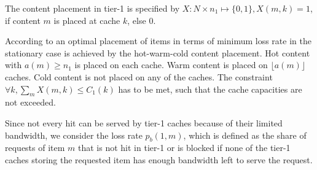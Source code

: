 The content placement in tier-1 is specified by $X: N \times n_1\mapsto \{0,1\}, X(m,k) = 1$, if content $m$ is placed at cache $k$, else $0$.

According to \cite{valancius2009greening} an optimal placement of items in terms of minimum loss rate in the stationary case is achieved by the hot-warm-cold content placement.
Hot content with $a(m)\geq n_1$ is placed on each cache.
Warm content is placed on $\lfloor a(m) \rfloor$ caches.
Cold content is not placed on any of the caches.
The constraint  $\forall k, \sum_m X(m,k)\leq C_1(k)$ has to be met, such that the cache capacities are not exceeded.

%




%

Since not every hit can be served by tier-1 caches because of their limited bandwidth, we consider the loss rate $p_{b}(1,m)$, which is defined as the share of requests of item $m$ that is not hit in tier-1 or is blocked if none of the tier-1 caches storing the requested item has enough bandwidth left to serve the request.

